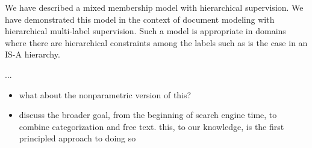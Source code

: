 We have described a mixed membership model with hierarchical supervision. We have demonstrated this model in the context of document modeling with hierarchical multi-label supervision. Such a model is appropriate in domains where there are hierarchical constraints among the labels such as is the case in an IS-A hierarchy.

...

\begin{itemize}
\item what about the nonparametric version of this?
\item discuss the broader goal, from the beginning of search engine time, to combine categorization and free text.  this, to our knowledge, is the first principled approach to doing so
\end{itemize}
